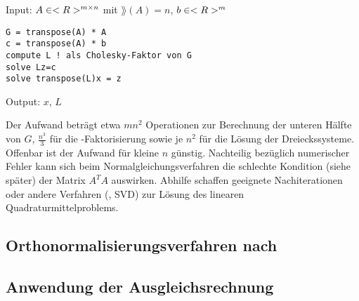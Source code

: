 \begin{algorithm}
	Input: $A\in<R>^{m\times n}$ mit $\rang(A)=n$, $b\in<R>^m$
	\begin{lstlisting}
G = transpose(A) * A
c = transpose(A) * b
compute L ! als Cholesky-Faktor von G
solve Lz=c
solve transpose(L)x = z
	\end{lstlisting}
	Output: $x$, $L$
\end{algorithm}

\begin{remark}
	Der Aufwand beträgt etwa $mn^2$ Operationen zur Berechnung der unteren Hälfte von $G$, $\frac{n^3}{3}$ für die -Faktorisierung sowie je $n^2$ für die Lösung der Dreieckssysteme. Offenbar ist der Aufwand für kleine $n$ günstig. Nachteilig bezüglich numerischer Fehler kann sich beim Normalgleichungsverfahren die schlechte Kondition (siehe später) der Matrix $A^TA$ auswirken. Abhilfe schaffen geeignete Nachiterationen oder andere Verfahren (, SVD) zur Lösung des linearen Quadraturmittelproblems.
\end{remark}

\subsection{Orthonormalisierungsverfahren nach }

\subsection{Anwendung der Ausgleichsrechnung}